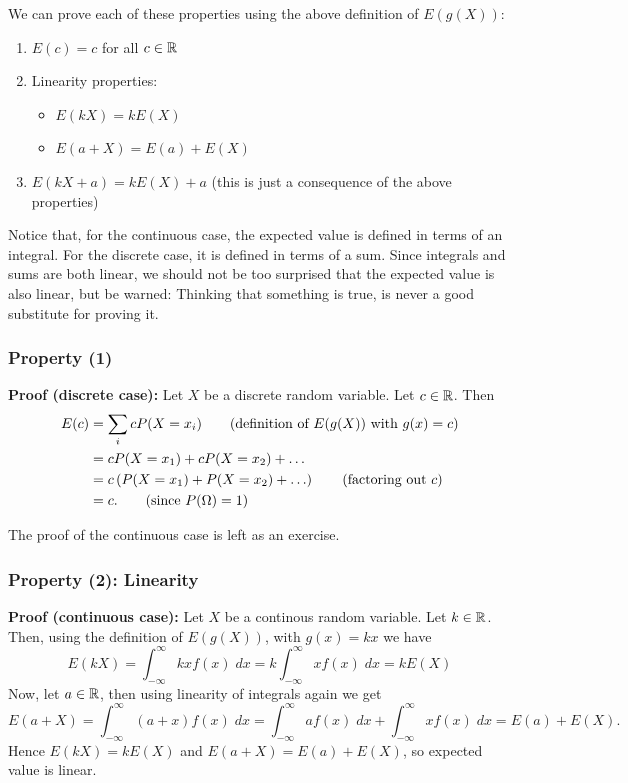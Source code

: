 \noindent We can prove each of these properties using the above definition of $E(g(X))$:
\begin{enumerate}
\item $E(c) = c$ for all $c \in \mathbb{R}$
\item Linearity properties:
\begin{itemize}
\item $E(kX) = kE(X)$
\item $E(a + X) = E(a) + E(X)$
\end{itemize}
\item $E(kX + a) = kE(X) + a$ (this is just a consequence of the above properties)
\end{enumerate}

\noindent Notice that, for the continuous case, the expected value is defined in terms of an integral. For the discrete case, it is defined in terms of a sum. Since integrals and sums are both linear, we should not be too surprised that the expected value is also linear, but be warned: Thinking that something is true, is never a good substitute for proving it.

\subsubsection{Property (1)}
\noindent \textbf{Proof (discrete case):}
Let $X$ be a discrete random variable. Let $c \in \mathbb{R}$. Then
\begin{align*}
E(c)  & = \sum_i c P(X = x_i) \tag{definition of $E(g(X))$ with $g(x) = c$} \\
	& = cP(X = x_1) + cP(X = x_2) + \ldots \\
	& = c\left(P(X = x_1) + P(X = x_2) + \ldots\right) \tag{factoring out $c$} \\
	& = c. \tag{since $P(\Omega) = 1$}
\end{align*}

\noindent The proof of the continuous case is left as an exercise.

\subsubsection{Property (2): Linearity}

\noindent \textbf{Proof (continuous case):}
Let $X$ be a continous random variable. Let $k \in \mathbb{R}$. Then, using the definition of $E(g(X))$, with $g(x) = kx$ we have
\[
E(kX) = \int_{-\infty}^\infty kxf(x) \; dx = k\int_{-\infty}^\infty xf(x) \; dx = kE(X) \tag{using linearity of integrals}
\]
Now, let $a \in \mathbb{R}$, then using linearity of integrals again we get
\[
E(a+X) = \int_{-\infty}^\infty (a+x)f(x) \; dx = \int_{-\infty}^\infty af(x) \; dx + \int_{-\infty}^\infty xf(x) \; dx = E(a) + E(X).
\]
Hence $E(kX) = kE(X)$  and $E(a + X) = E(a) + E(X)$, so expected value is linear. \\

